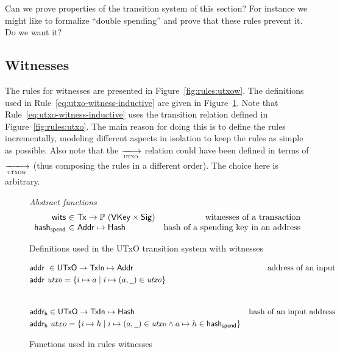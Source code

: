 \documentclass[11pt,a4paper]{article}
\newcommand{\Tx}{\type{Tx}}
\newcommand{\Addr}{\type{Addr}}
\newcommand{\UTxO}{\type{UTxO}}
\newcommand{\TxIn}{\type{TxIn}}
\newcommand{\VKey}{\type{VKey}}
\newcommand{\Hash}{\type{Hash}}
\newcommand{\Sig}{\type{Sig}}
\newcommand{\addr}[1]{\fun{addr}~ \var{#1}}
\newcommand{\wcard}[0]{\underline{\phantom{a}}}
\begin{document}
\begin{todo}
  Can we prove properties of the transition system of this section? For
  instance we might like to formalize ``double spending'' and prove that these
  rules prevent it. Do we want it?
\end{todo}

\subsection{Witnesses}
\label{sec:witnesses}

The rules for witnesses are presented in Figure~\ref{fig:rules:utxow}.
The definitions used in Rule~\ref{eq:utxo-witness-inductive} are given in
Figure~\ref{fig:defs:utxow}. Note that
Rule~\ref{eq:utxo-witness-inductive} uses the transition relation defined in
Figure~\ref{fig:rules:utxo}. The main reason for doing this is to define
the rules incrementally, modeling different aspects in isolation to keep the
rules as simple as possible. Also note that the $\trans{utxo}{}$ relation could
have been defined in terms of $\trans{utxow}{}$ (thus composing the rules in a
different order). The choice here is arbitrary.

\begin{figure}
  \emph{Abstract functions}
  \begin{equation*}
    \begin{array}{r@{~\in~}lr}
      \fun{wits} & \Tx \to \powerset{(\VKey \times \Sig)}
      & \text{witnesses of a transaction}\\
      \fun{hash_{spend}} & \Addr \mapsto \Hash
      & \text{hash of a spending key in an address}\\
    \end{array}
  \end{equation*}
  \caption{Definitions used in the UTxO transition system with witnesses}
  \label{fig:defs:utxow}
\end{figure}

\begin{figure}
  \begin{align*}
    & \addr{}{} \in \UTxO \to \TxIn \mapsto \Addr & \text{address of an input}\\
    & \addr{utxo} = \{ i \mapsto a \mid i \mapsto (a, \wcard) \in \var{utxo} \} \\
    \nextdef
    & \fun{addr_h} \in \UTxO \to \TxIn \mapsto \Hash & \text{hash of an input address}\\
    & \fun{addr_h}~utxo = \{ i \mapsto h \mid i \mapsto (a, \wcard) \in \var{utxo}
      \wedge a \mapsto h \in \fun{hash_{spend}} \}
  \end{align*}
  \caption{Functions used in rules witnesses}
  \label{fig:derived-defs:utxow}
\end{figure}
\end{document}
